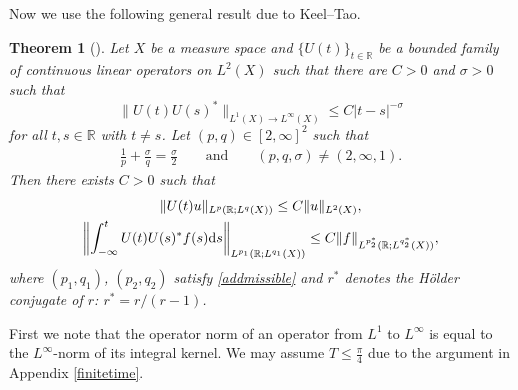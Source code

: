 \documentclass[pdftex]{sigma}
\numberwithin{equation}{section}
\newtheorem{Theorem}{Theorem}[section]
\def\R{\mathbb{R}}%
\def\s{\sigma}
\begin{document}
Now we use the following general result due to Keel--Tao.




\begin{Theorem}[\cite{KT}]\label{KeelTao}
Let $X$ be a measure space and $\{U(t)\}_{t\in \R}$ be a bounded family of continuous linear operators on $L^2(X)$ such that there are $C>0$ and $\s>0$ such that
\[
\|U(t)U(s)^*\|_{L^1(X)\to L^{\infty}(X)}\leq C|t-s|^{-\s}
\]
 for all $t,s\in \R$ with $t\neq s$. Let $(p,q)\in [2,\infty]^2$ such that
\begin{align}\label{addmissible}
\frac{1}{p}+\frac{\s}{q}=\frac{\s}{2} \qquad \text{and}\qquad (p,q,\s)\neq (2,\infty,1).
\end{align}
Then there exists $C>0$ such that
\begin{gather*}
\|U(t)u\|_{L^p(\R; L^q(X))}\leq C\|u\|_{L^2(X)},\\
 \left\|\int_{-\infty}^tU(t)U(s)^*f(s){\rm d}s \right\|_{L^{p_1}(\R; L^{q_1}(X))} \leq C\|f\|_{L^{p_2^*}(\R; L^{q_2^*}(X))},
\end{gather*}
where $(p_1,q_1)$, $(p_2,q_2)$ satisfy \eqref{addmissible} and $r^*$ denotes the H\"older conjugate of $r$: $r^*=r/(r-1)$.



\end{Theorem}





First we note that the operator norm of an operator from $L^1$ to $L^{\infty}$ is equal to the $L^{\infty}$-norm of its integral kernel.
We may assume $T\leq \frac{\pi}{4}$ due to the argument in Appendix \ref{finitetime}.
\end{document}
